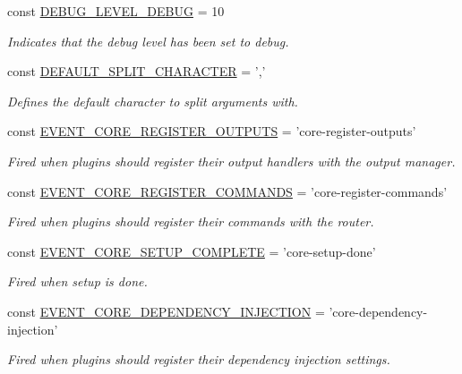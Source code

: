 \begin{DoxyCompactItemize}
const \hyperlink{group__debug__levels_ga081b2a8b4f0b1d1216fd2f143c8bc1a6}{D\-E\-B\-U\-G\-\_\-\-L\-E\-V\-E\-L\-\_\-\-D\-E\-B\-U\-G} = 10
\begin{DoxyCompactList}\small\item\em Indicates that the debug level has been set to debug. \end{DoxyCompactList}\item 
const \hyperlink{common_8inc_a5fe77ccb49fee356e22cffa5a058e20d}{D\-E\-F\-A\-U\-L\-T\-\_\-\-S\-P\-L\-I\-T\-\_\-\-C\-H\-A\-R\-A\-C\-T\-E\-R} = ','
\begin{DoxyCompactList}\small\item\em Defines the default character to split arguments with. \end{DoxyCompactList}\item 
const \hyperlink{group__events_gaac23553a1eec1074d5077678c6a02afc}{E\-V\-E\-N\-T\-\_\-\-C\-O\-R\-E\-\_\-\-R\-E\-G\-I\-S\-T\-E\-R\-\_\-\-O\-U\-T\-P\-U\-T\-S} = 'core-\/register-\/outputs'
\begin{DoxyCompactList}\small\item\em Fired when plugins should register their output handlers with the output manager. \end{DoxyCompactList}\item 
const \hyperlink{group__events_ga1cf767d9d7ceda78534ff850d912e56f}{E\-V\-E\-N\-T\-\_\-\-C\-O\-R\-E\-\_\-\-R\-E\-G\-I\-S\-T\-E\-R\-\_\-\-C\-O\-M\-M\-A\-N\-D\-S} = 'core-\/register-\/commands'
\begin{DoxyCompactList}\small\item\em Fired when plugins should register their commands with the router. \end{DoxyCompactList}\item 
const \hyperlink{group__events_ga87085c0924b7cd74a4cd3902fcd51f48}{E\-V\-E\-N\-T\-\_\-\-C\-O\-R\-E\-\_\-\-S\-E\-T\-U\-P\-\_\-\-C\-O\-M\-P\-L\-E\-T\-E} = 'core-\/setup-\/done'
\begin{DoxyCompactList}\small\item\em Fired when setup is done. \end{DoxyCompactList}\item 
const \hyperlink{group__events_gaac3643817d4679af4e938b5664e3c7b9}{E\-V\-E\-N\-T\-\_\-\-C\-O\-R\-E\-\_\-\-D\-E\-P\-E\-N\-D\-E\-N\-C\-Y\-\_\-\-I\-N\-J\-E\-C\-T\-I\-O\-N} = 'core-\/dependency-\/injection'
\begin{DoxyCompactList}\small\item\em Fired when plugins should register their dependency injection settings. \end{DoxyCompactList}\item 

\end{DoxyCompactItemize}
